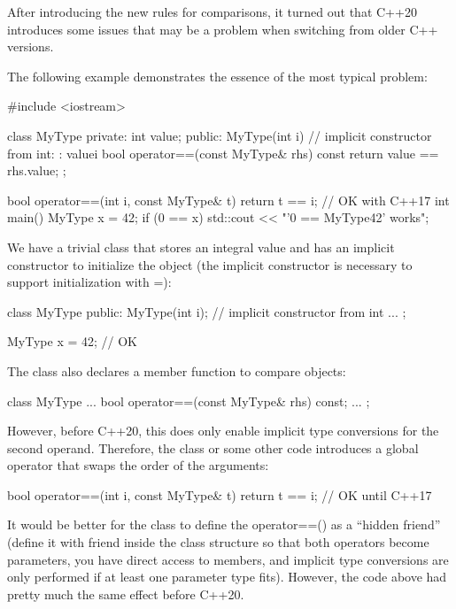 
After introducing the new rules for comparisons, it turned out that C++20 introduces some issues that may be a problem when switching from older C++ versions.


The following example demonstrates the essence of the most typical problem:


\begin{cpp}
#include <iostream>

class MyType {
private:
	int value;
public:
	MyType(int i) // implicit constructor from int:
		: value{i} {
	}
	bool operator==(const MyType& rhs) const {
		return value == rhs.value;
	}
};

bool operator==(int i, const MyType& t) {
	return t == i; // OK with C++17
}
int main()
{
	MyType x = 42;
	if (0 == x) {
		std::cout << "'0 == MyType{42}' works\n";
	}
}
\end{cpp}

We have a trivial class that stores an integral value and has an implicit constructor to initialize the object (the implicit constructor is necessary to support initialization with =):

\begin{cpp}
class MyType {
	public:
	MyType(int i); // implicit constructor from int
	...
};

MyType x = 42; // OK
\end{cpp}

The class also declares a member function to compare objects:

\begin{cpp}
class MyType {
	...
	bool operator==(const MyType& rhs) const;
	...
};
\end{cpp}

However, before C++20, this does only enable implicit type conversions for the second operand. Therefore, the class or some other code introduces a global operator that swaps the order of the arguments:

\begin{cpp}
bool operator==(int i, const MyType& t) {
	return t == i; // OK until C++17
}
\end{cpp}

It would be better for the class to define the operator==() as a “hidden friend” (define it with friend inside the class structure so that both operators become parameters, you have direct access to members, and implicit type conversions are only performed if at least one parameter type fits). However, the code above had pretty much the same effect before C++20.

